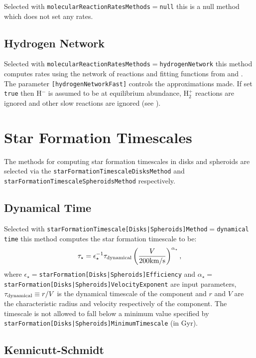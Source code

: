 Selected with {\tt molecularReactionRatesMethods}$=${\tt null} this is a null method which does not set any rates.

\subsection{Hydrogen Network}

Selected with {\tt molecularReactionRatesMethods}$=${\tt hydrogenNetwork} this method computes rates using the network of reactions and fitting functions from \cite{abel_modeling_1997} and \cite{tegmark_small_1997}. The parameter {\tt [hydrogenNetworkFast]} controls the approximations made. If set {\tt true} then H$^-$ is assumed to be at equilibrium abundance, H$_2^+$ reactions are ignored and other slow reactions are ignored (see \citealt{abel_modeling_1997}).

\section{Star Formation Timescales}

The methods for computing star formation timescales in disks and spheroids are selected via the {\tt starFormationTimescaleDisksMethod} and {\tt starFormationTimescaleSpheroidsMethod} respectively.

\subsection{Dynamical Time}

Selected with {\tt starFormationTimescale[Disks|Spheroids]Method}$=${\tt dynamical time} this method computes the star formation timescale to be:
\begin{equation}
 \tau_\star = \epsilon_\star^{-1} \tau_{\rm dynamical} \left( {V \over 200\hbox{km/s}} \right)^{\alpha_\star},
\end{equation}
where $\epsilon_\star=${\tt starFormation[Disks|Spheroids]Efficiency} and $\alpha_\star=${\tt starFormation[Disks|Spheroids]VelocityExponent} are input parameters, $\tau_{\rm dynamical}\equiv r/V$ is the dynamical timescale of the component and $r$ and $V$ are the characteristic radius and velocity respectively of the component. The timescale is not allowed to fall below a minimum value specified by {\tt starFormation[Disks|Spheroids]MinimumTimescale} (in Gyr).

\subsection{Kennicutt-Schmidt}\label{sec:StarFormationKennicuttSchmidt}

